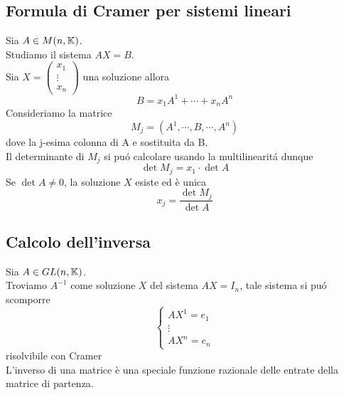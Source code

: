 \subsection{Formula di Cramer per sistemi lineari}
Sia $A \in M(n,\mathbb{K}) $.\\
Studiamo il sistema $AX=B$.\\
Sia $X=\begin{pmatrix} x_1 \\ \vdots \\ x_n \end{pmatrix}$ una soluzione allora
$$ B= x_1 A^1 + \cdots + x_n A ^n $$ 
Consideriamo la matrice $$M_j = \left( A^1, \cdots , B , \cdots , A^n \right) $$
dove la j-esima colonna di A e sostituita da B.\\
Il determinante di $M_j$ si pu\'o calcolare usando la multilinearit\'a dunque 
$$ \det M_j =x_1 \cdot \det A $$
Se $\det A \neq 0 $, la soluzione $X$ esiste ed \`e unica 
$$ x_j = \frac{\det M_j }{\det A }$$
\subsection{Calcolo dell'inversa}
Sia $A \in GL(n,\mathbb{K}) $.\\
Troviamo $A^{-1} $ come soluzione $X$ del sistema $AX=I_n$, tale sistema si pu\'o scomporre
$$ \begin{cases}
AX^1=e_1 \\ \vdots \\ AX^n=e_n
\end{cases}$$ risolvibile con Cramer\\
L'inverso di una matrice \`e una speciale funzione razionale delle entrate della matrice di partenza.
\newpage
